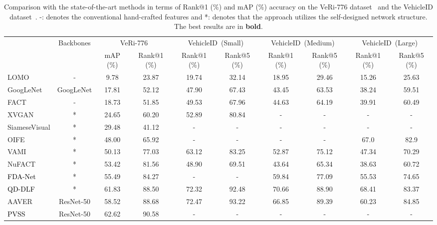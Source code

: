 \documentclass[journal]{IEEEtran}
\newcommand{\zznote}[1]{\textcolor{black}{#1}}
\begin{document}
\begin{table*}
\caption{Comparison with the state-of-the-art methods in terms of Rank@1 (\%) and mAP (\%) accuracy on the VeRi-776 dataset~\cite{liu2016deep} and the VehicleID dataset~\cite{liu2016pku}. -: denotes the conventional hand-crafted features and *: denotes that the approach utilizes the self-designed network structure. The best results are in \textbf{bold}. }
\label{table:veri}
\vspace{-.2in}
\begin{center}
{
\setlength{\tabcolsep}{3pt}
\begin{tabular}{l| c| c c | c c| c c| c c}
\shline
\multirow{2}{*}{Methods} & \multirow{2}{*}{Backbones} & \multicolumn{2}{c|}{VeRi-776} & \multicolumn{2}{c|}{VehicleID~(Small)} & \multicolumn{2}{c|}{VehicleID~(Medium)} & \multicolumn{2}{c}{VehicleID~(Large)}\\
& & mAP (\%) & Rank@1 (\%) & Rank@1 (\%) & Rank@5 (\%)  & Rank@1 (\%) & Rank@5 (\%) & Rank@1 (\%) & Rank@5 (\%) \\
\hline
LOMO \cite{liao2015person} & - & 9.78 & 23.87 & 19.74 & 32.14 & 18.95 & 29.46 & 15.26 & 25.63\\
GoogLeNet \cite{yang2015large} & GoogLeNet & 17.81 & 52.12 & 47.90 & 67.43 & 43.45 & 63.53 & 38.24 & 59.51\\
FACT \cite{liu2016deep} & - & 18.73 & 51.85 & 49.53 & 67.96 & 44.63 & 64.19 &  39.91 & 60.49\\
XVGAN \cite{zhou2017cross} & * & 24.65 & 60.20 & 52.89 & 80.84 & - & - & - & - \\
SiameseVisual \cite{shen2017learning}& *&29.48 & 41.12 & - & - & - & - & - & - \\
OIFE \cite{wang2017orientation} & * &48.00 & 65.92 & - & -& -& - & 67.0 & 82.9\\
VAMI \cite{zhou2018aware}& * &50.13 & 77.03 & 63.12 & 83.25 & 52.87 & 75.12 & 47.34 & 70.29\\
NuFACT \cite{liu2017provid} & * & 53.42 & 81.56 & 48.90 & 69.51 & 43.64 & 65.34 & 38.63  & 60.72  \\
\zznote{FDA-Net} \cite{lou2019veri} &  * & 55.49 & 84.27 & - & - & 59.84 & 77.09 & 55.53 & 74.65 \\
\zznote{QD-DLF} \cite{zhu2019vehicle} & * & 61.83 & 88.50 & 72.32 & 92.48 & 70.66 & 88.90 & 68.41 & 83.37 \\
\hline
AAVER \cite{khorramshahi2019dual} & ResNet-50 & 58.52 & 88.68 & 72.47 & 93.22 & 66.85 & 89.39 & 60.23 & 84.85 \\
\zznote{PVSS} \cite{liu2019pvss} & ResNet-50 & 62.62 & 90.58 & - & - & - & - & - & - \\

\end{tabular}}
\end{center}
\end{table*}
\end{document}
